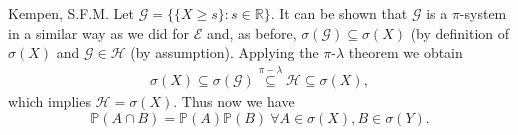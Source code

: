 \begin{solution}[5.3]{Kempen, S.F.M.}
    \noindent Let $\mathcal{G} = \{\{X\geq s\}: s\in \mathbb{R}\}$. It can be shown that $\mathcal{G}$ is a $\pi$-system in a similar way as we did for $\mathcal{E}$ and, as before, $\sigma(\mathcal{G}) \subseteq \sigma(X)$ (by definition of $\sigma(X)$ and $\mathcal{G} \in \mathcal{H}$ (by assumption). Applying the $\pi$-$\lambda$ theorem we obtain
    \begin{align*}
        \sigma(X) \subseteq \sigma(\mathcal{G}) \stackrel{\pi-\lambda}{\subseteq} \mathcal{H} \subseteq \sigma(X),
    \end{align*}
    which implies $\mathcal{H} = \sigma(X)$. Thus now we have
    $$ \mathbb{P}(A\cap B) = \mathbb{P}(A)\mathbb{P}(B) \ \forall A\in \sigma(X), B\in \sigma(Y).  $$

\end{solution}


